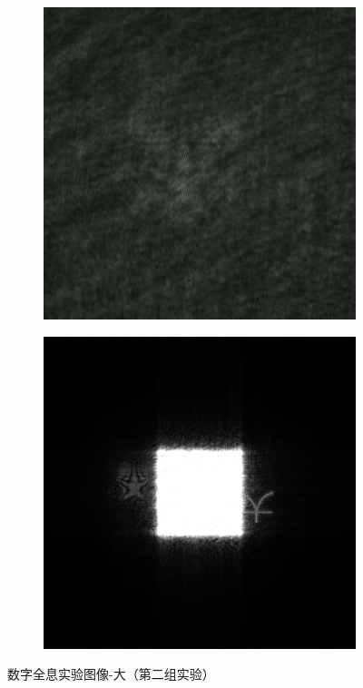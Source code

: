 \documentclass{ctexart}
\begin{document}
\begin{figure}[H]
  \centering
  \begin{subfigure}{.48\textwidth}
    \includegraphics[width=\linewidth]{数字全息实验数据/数字全息/大2/大2.jpg}
  \end{subfigure}
  \begin{subfigure}{.48\textwidth}
    \includegraphics[width=\linewidth]{数字全息实验数据/数字全息/大2/数字全息输出结果-大2.jpg}
  \end{subfigure}
  \caption{数字全息实验图像-大（第二组实验）}
\end{figure}
\end{document}
